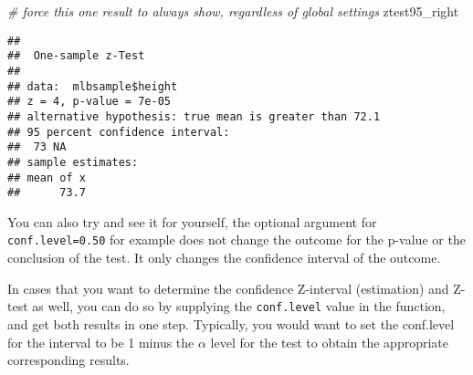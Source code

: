 \documentclass[
]{article}
\newenvironment{Shaded}{\begin{snugshade}}{\end{snugshade}}
\newcommand{\AttributeTok}[1]{\textcolor[rgb]{0.77,0.63,0.00}{#1}}
\newcommand{\CommentTok}[1]{\textcolor[rgb]{0.56,0.35,0.01}{\textit{#1}}}
\newcommand{\FloatTok}[1]{\textcolor[rgb]{0.00,0.00,0.81}{#1}}
\newcommand{\FunctionTok}[1]{\textcolor[rgb]{0.00,0.00,0.00}{#1}}
\newcommand{\NormalTok}[1]{#1}
\newcommand{\OtherTok}[1]{\textcolor[rgb]{0.56,0.35,0.01}{#1}}
\newcommand{\SpecialCharTok}[1]{\textcolor[rgb]{0.00,0.00,0.00}{#1}}
\newcommand{\StringTok}[1]{\textcolor[rgb]{0.31,0.60,0.02}{#1}}
\begin{document}
\begin{Shaded}
\end{Shaded}

\begin{Shaded}
\begin{Highlighting}[]
\CommentTok{\# force this one result to always show, regardless of global settings}
\NormalTok{ztest95\_right}
\end{Highlighting}
\end{Shaded}

\begin{verbatim}
## 
##  One-sample z-Test
## 
## data:  mlbsample$height
## z = 4, p-value = 7e-05
## alternative hypothesis: true mean is greater than 72.1
## 95 percent confidence interval:
##  73 NA
## sample estimates:
## mean of x 
##      73.7
\end{verbatim}

You can also try and see it for yourself, the optional argument for
\texttt{conf.level=0.50} for example does not change the outcome for the
p-value or the conclusion of the test. It only changes the confidence
interval of the outcome.

In cases that you want to determine the confidence Z-interval
(estimation) and Z-test as well, you can do so by supplying the
\texttt{conf.level} value in the function, and get both results in one
step. Typically, you would want to set the conf.level for the interval
to be 1 minus the \(\alpha\) level for the test to obtain the
appropriate corresponding results.
\end{document}
